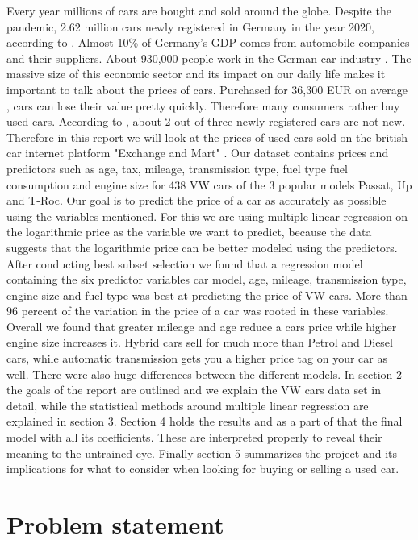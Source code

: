 \documentclass[12 pt]{scrartcl}
\begin{document}
Every year millions of cars are bought and sold around the globe. Despite the pandemic, 2.62 million cars newly registered in Germany in the year 2020, according to \citet{Statisti39}.
Almost 10\% of Germany's GDP comes from automobile companies and their suppliers. About 930,000 people work in the German car industry \citep{dw}.
The massive size of this economic sector and its impact on our daily life makes it important to talk about the prices of cars. Purchased for 36,300 EUR on average \citep{Statista2}, cars can lose their value pretty quickly. Therefore many consumers rather buy used cars. According to \citet{Handelsblatt}, about 2 out of three newly registered cars are not new. Therefore in this report we will look at the prices of used cars sold on the british car internet platform "Exchange and Mart" \citep{Exchangeandmart}. Our dataset contains prices and predictors such as age, tax, mileage, transmission type, fuel type  fuel consumption and engine size for 438 VW cars of the 3 popular models Passat, Up and T-Roc. Our goal is to predict the price of a car as accurately as possible using the variables mentioned. For this we are using multiple linear regression on the logarithmic price as the variable we want to predict, because the data suggests that the logarithmic price can be better modeled using the predictors. After conducting best subset selection we found that a regression model containing the six predictor variables car model, age, mileage, transmission type, engine size and fuel type was best at predicting the price of VW cars. More than 96 percent of the variation in the price of a car was rooted in these variables. Overall we found that greater mileage and age reduce a cars price while higher engine size increases it. Hybrid cars sell for much more than Petrol and Diesel cars, while automatic transmission gets you a higher price tag on your car as well.
There were also huge differences between the different models.
In section 2 the goals of the report are outlined and we explain the VW cars data set in detail, while the statistical methods around multiple linear regression are explained in section 3. Section 4 holds the results and as a part of that the final model with all its coefficients. These are interpreted properly to reveal their meaning to the untrained eye. Finally section 5 summarizes the project and its implications for what to consider when looking for buying or selling a used car.

\section{Problem statement}
\end{document}
